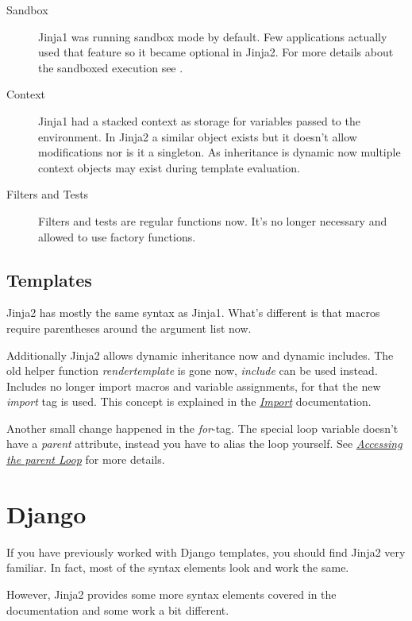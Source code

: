 \documentclass[a4paper,10pt,english]{sphinxmanual}
\begin{document}
\begin{description}
\item[{Sandbox}] \leavevmode
Jinja1 was running sandbox mode by default.  Few applications actually
used that feature so it became optional in Jinja2.  For more details
about the sandboxed execution see .

\item[{Context}] \leavevmode
Jinja1 had a stacked context as storage for variables passed to the
environment.  In Jinja2 a similar object exists but it doesn't allow
modifications nor is it a singleton.  As inheritance is dynamic now
multiple context objects may exist during template evaluation.

\item[{Filters and Tests}] \leavevmode
Filters and tests are regular functions now.  It's no longer necessary
and allowed to use factory functions.

\end{description}


\subsection{Templates}
\label{switching:templates}
Jinja2 has mostly the same syntax as Jinja1.  What's different is that
macros require parentheses around the argument list now.

Additionally Jinja2 allows dynamic inheritance now and dynamic includes.
The old helper function \emph{rendertemplate} is gone now, \emph{include} can be used
instead.  Includes no longer import macros and variable assignments, for
that the new \emph{import} tag is used.  This concept is explained in the
{\hyperref[templates:import]{\emph{Import}}} documentation.

Another small change happened in the \emph{for}-tag.  The special loop variable
doesn't have a \emph{parent} attribute, instead you have to alias the loop
yourself.  See {\hyperref[tricks:accessing-the-parent-loop]{\emph{Accessing the parent Loop}}} for more details.


\section{Django}
\label{switching:django}
If you have previously worked with Django templates, you should find
Jinja2 very familiar.  In fact, most of the syntax elements look and
work the same.

However, Jinja2 provides some more syntax elements covered in the
documentation and some work a bit different.
\end{document}
